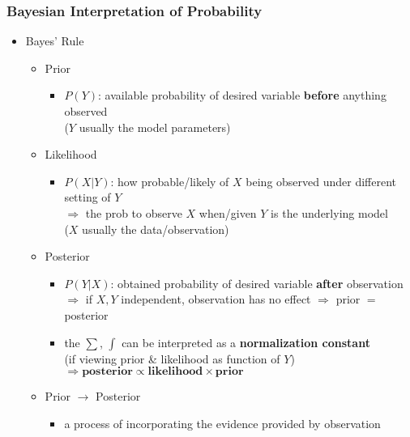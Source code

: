 \subsubsection{Bayesian Interpretation of Probability}
\begin{itemize}
\item Bayes' Rule
	\begin{itemize}
	\item Prior
		\begin{itemize}
		\item $P(Y)$: available probability of desired variable \textbf{before} anything observed \\		
		($Y$ usually the model parameters)
		\end{itemize}
	\item Likelihood
		\begin{itemize}
		\item $P(X|Y)$: how probable/likely of $X$ being observed under different setting of $Y$ \\
		$\Rightarrow$ the prob to observe $X$ when/given $Y$ is the underlying model \\
		($X$ usually the data/observation)
		\end{itemize}
	\item Posterior
		\begin{itemize}
		\item $P(Y|X)$: obtained probability of desired variable \textbf{after} observation \\
		$\Rightarrow$ if $X,Y$ independent, observation has no effect $\Rightarrow$ prior $=$ posterior
		\item the $\sum$, $\int$ can be interpreted as a \textbf{normalization constant} \\
		(if viewing prior \& likelihood as function of $Y$)
		$\Rightarrow \textbf{posterior} \propto \textbf{likelihood} \times \textbf{prior}$
		\end{itemize}
	\item Prior $\rightarrow$ Posterior
		\begin{itemize}
		\item a process of incorporating the evidence provided by observation
		\end{itemize}
	\end{itemize}
	

\end{itemize}

